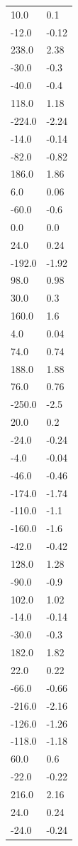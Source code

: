 \begin{longtable}{ll}
10.0 & 0.1 \\
-12.0 & -0.12 \\
238.0 & 2.38 \\
-30.0 & -0.3 \\
-40.0 & -0.4 \\
118.0 & 1.18 \\
-224.0 & -2.24 \\
-14.0 & -0.14 \\
-82.0 & -0.82 \\
186.0 & 1.86 \\
6.0 & 0.06 \\
-60.0 & -0.6 \\
0.0 & 0.0 \\
24.0 & 0.24 \\
-192.0 & -1.92 \\
98.0 & 0.98 \\
30.0 & 0.3 \\
160.0 & 1.6 \\
4.0 & 0.04 \\
74.0 & 0.74 \\
188.0 & 1.88 \\
76.0 & 0.76 \\
-250.0 & -2.5 \\
20.0 & 0.2 \\
-24.0 & -0.24 \\
-4.0 & -0.04 \\
-46.0 & -0.46 \\
-174.0 & -1.74 \\
-110.0 & -1.1 \\
-160.0 & -1.6 \\
-42.0 & -0.42 \\
128.0 & 1.28 \\
-90.0 & -0.9 \\
102.0 & 1.02 \\
-14.0 & -0.14 \\
-30.0 & -0.3 \\
182.0 & 1.82 \\
22.0 & 0.22 \\
-66.0 & -0.66 \\
-216.0 & -2.16 \\
-126.0 & -1.26 \\
-118.0 & -1.18 \\
60.0 & 0.6 \\
-22.0 & -0.22 \\
216.0 & 2.16 \\
24.0 & 0.24 \\
-24.0 & -0.24 \\

\end{longtable}
